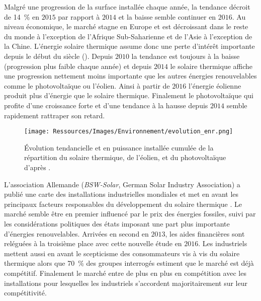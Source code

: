 Malgré une progression de la surface installée chaque année, la tendance décroit
de \SI{14}{\percent} en $2015$ par rapport à $2014$ et la baisse semble continuer en
$2016$. Au niveau économique, le marché stagne en Europe et est décroissant dans le reste
du monde à l’exception de l’Afrique Sub-Saharienne et de l’Asie à l’exception de la Chine.
L’énergie solaire thermique assume donc une perte d’intérêt importante depuis le début du siècle
(). Depuis $2010$ la tendance est toujours à la baisse (progression plus
faible chaque année) et depuis $2014$ le solaire thermique affiche une progression nettement moins importante
que les autres énergies renouvelables comme le photovoltaïque ou l’éolien. Ainsi à partir
de $2016$ l’énergie éolienne produit plus d’énergie que le solaire thermique. Finalement
le photovoltaïque qui profite d’une croissance forte et d’une tendance à la hausse depuis $2014$
semble rapidement rattraper son retard.

\begin{figure}
    \centering
    \texttt{[image: Ressources/Images/Environnement/evolution\_enr.png]}
    \caption[Évolution tendancielle du solaire thermique, éolien, et photovoltaïque]
            {Évolution tendancielle et en puissance installée cumulée de la répartition
             du solaire thermique, de l’éolien, et du photovoltaïque d’après
             \textcite{Weiss2017}.}
    \label{fig:tendances_enr}
\end{figure}

L’association Allemande (\textit{BSW-Solar}, German Solar Industry Association)
a publié une carte des installations industrielles mondiales et met en avant les
principaux facteurs responsables du développement du solaire thermique \parencite{Augsten2017}.
Le  marché semble être en premier influencé par le prix des énergies fossiles, suivi par les considérations
politiques des états imposant une part plus importante d’énergies renouvelables. Arrivées
en second en $2013$, les aides financières sont reléguées à la troisième place avec
cette nouvelle étude en $2016$. Les industriels
mettent aussi en avant le scepticisme des consommateurs vis à vis du solaire thermique
alors que \SI{70}{\percent} des groupes interrogés estiment que le marché est déjà
compétitif. Finalement le marché entre de plus en plus en compétition avec les installations  pour
lesquelles les industriels s’accordent majoritairement sur leur compétitivité.


